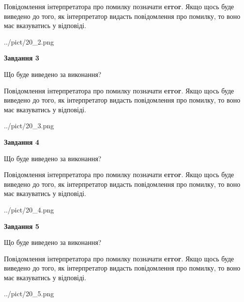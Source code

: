 \documentclass[12pt, ukrainian]{article}
\begin{document}
{\begin {large}
Повідомлення інтерпретатора про помилку позначати \textbf{error}.
Якщо щось буде виведено до того, як інтерпретатор видасть повідомлення про помилку, 
то воно має вказуватись у відповіді. \par


\begin{center}
	{../pict/20_2.png}
\end{center}
\newpage

{\begin {center}\textbf{Завдання 3}\end {center}}\par
Що буде виведено за виконання?

Повідомлення інтерпретатора про помилку позначати \textbf{error}.
Якщо щось буде виведено до того, як інтерпретатор видасть повідомлення про помилку, 
то воно має вказуватись у відповіді. \par


\begin{center}
	{../pict/20_3.png}
\end{center}
\newpage

{\begin {center}\textbf{Завдання 4}\end {center}}\par
Що буде виведено за виконання?

Повідомлення інтерпретатора про помилку позначати \textbf{error}.
Якщо щось буде виведено до того, як інтерпретатор видасть повідомлення про помилку, 
то воно має вказуватись у відповіді. \par


\begin{center}
	{../pict/20_4.png}
\end{center}
\newpage

{\begin {center}\textbf{Завдання 5}\end {center}}\par
Що буде виведено за виконання?

Повідомлення інтерпретатора про помилку позначати \textbf{error}.
Якщо щось буде виведено до того, як інтерпретатор видасть повідомлення про помилку, 
то воно має вказуватись у відповіді. \par


\begin{center}
	{../pict/20_5.png}
\end{center}
\newpage


\end{large}}
\end{document}
